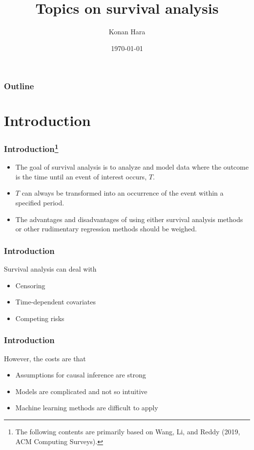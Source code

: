 \documentclass[14pt]{beamer}
\title[Survival analysis]{Topics on survival analysis}
\author[K.Hara]{Konan Hara}
\institute[Univ. of Tokyo]{Department of Public Health\\University of Tokyo}
\date{\today}
\begin{document}
	\begin{frame}[plain]
	\titlepage
	\end{frame}

	\begin{frame}
	\frametitle{Outline}
	\tableofcontents
	\end{frame}

	\AtBeginSection[]
	{
	   \begin{frame}
	       \frametitle{Outline}
	       \tableofcontents[currentsection]
	   \end{frame}
	}

	\section{Introduction}

	\begin{frame}
	\frametitle{Introduction\footnote{The following contents are primarily based on Wang, Li, and Reddy (2019, ACM Computing Surveys).}}
	\begin{itemize}
	\item The goal of survival analysis is to analyze and model data where the outcome is the time until an event of interest occurs, $T$.
	\item $T$ can always be transformed into an occurrence of the event within a specified period.
	\item The advantages and disadvantages of using either survival analysis methods or other rudimentary regression methods should be weighed.

	\end{itemize}
	\end{frame}

	\begin{frame}
	\frametitle{Introduction}
	Survival analysis can deal with
	\begin{itemize}
	\item Censoring
	\item Time-dependent covariates
	\item Competing risks

	\end{itemize}
	\end{frame}

	\begin{frame}
	\frametitle{Introduction}
	However, the costs are that
	\begin{itemize}
	\item Assumptions for causal inference are strong
	\item Models are complicated and not so intuitive
	\item Machine learning methods are difficult to apply

	\end{itemize}
	\end{frame}
\end{document}
